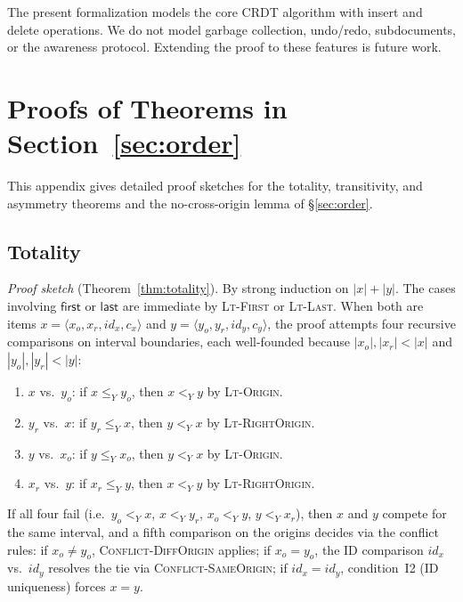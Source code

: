 \documentclass[sigplan,screen]{acmart}
\newcommand{\YjsLt}{\mathrel{<_Y}}
\newcommand{\YjsLeq}{\mathrel{\leq_Y}}
\newcommand{\First}{\mathsf{first}}
\newcommand{\Last}{\mathsf{last}}
\begin{document}
The present formalization models the core CRDT algorithm with insert
and delete operations.  We do not model garbage collection, undo/redo,
subdocuments, or the awareness protocol.  Extending the proof to these
features is future work.




\appendix

\section{Proofs of Theorems in Section~\ref{sec:order}}
\label{app:order-proofs}

This appendix gives detailed proof sketches for the totality,
transitivity, and asymmetry theorems and the no-cross-origin lemma of
\S\ref{sec:order}.

\subsection{Totality}

\noindent\textit{Proof sketch} (Theorem~\ref{thm:totality}).
By strong induction on $|x| + |y|$.
The cases involving $\First$ or $\Last$ are immediate
by \textsc{Lt-First} or \textsc{Lt-Last}.  When both are items
$x = \langle x_o, x_r, \mathit{id}_x, c_x \rangle$ and
$y = \langle y_o, y_r, \mathit{id}_y, c_y \rangle$,
the proof attempts four recursive comparisons on
interval boundaries, each well-founded because
$|x_o|, |x_r| < |x|$ and $|y_o|, |y_r| < |y|$:
\begin{enumerate}
\item $x$ vs.\ $y_o$: if $x \YjsLeq y_o$, then
  $x \YjsLt y$ by \textsc{Lt-Origin}.
\item $y_r$ vs.\ $x$: if $y_r \YjsLeq x$, then
  $y \YjsLt x$ by \textsc{Lt-RightOrigin}.
\item $y$ vs.\ $x_o$: if $y \YjsLeq x_o$, then
  $y \YjsLt x$ by \textsc{Lt-Origin}.
\item $x_r$ vs.\ $y$: if $x_r \YjsLeq y$, then
  $x \YjsLt y$ by \textsc{Lt-RightOrigin}.
\end{enumerate}
If all four fail (i.e.\ $y_o \YjsLt x$, $x \YjsLt y_r$,
$x_o \YjsLt y$, $y \YjsLt x_r$), then $x$ and $y$
compete for the same interval, and a fifth comparison
on the origins decides via the conflict rules:
if $x_o \neq y_o$, \textsc{Conflict-DiffOrigin}
applies; if $x_o = y_o$, the ID comparison
$\mathit{id}_x$ vs.\ $\mathit{id}_y$ resolves the
tie via \textsc{Conflict-SameOrigin}; if
$\mathit{id}_x = \mathit{id}_y$, condition~I2
(ID uniqueness) forces $x = y$.
\end{document}

